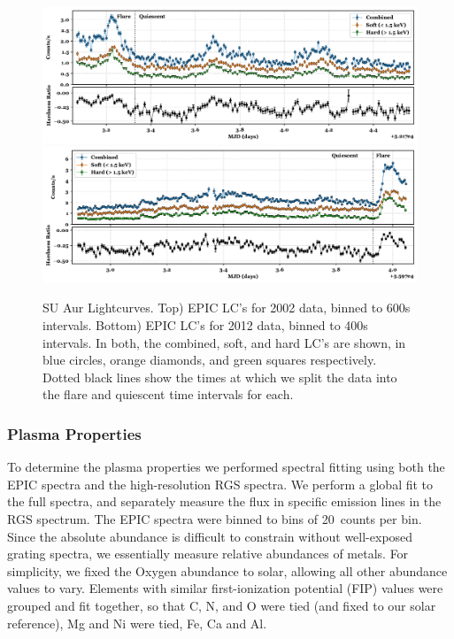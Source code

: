 \documentclass[twocolumn]{aastex631}
\begin{document}
\begin{figure}[b]
    \centering
    \includegraphics[width=0.9\linewidth]{Figures/SU Aur/figure_2002_lc.pdf}
    \includegraphics[width=0.9\linewidth]{Figures/SU Aur/figure_2012_lc.pdf}
    \caption{SU Aur Lightcurves. Top) EPIC LC's for 2002 data, binned to 600s intervals. Bottom) EPIC LC's for 2012 data, binned to 400s intervals. In both, the combined, soft, and hard LC's are shown, in blue circles, orange diamonds, and green squares respectively. Dotted black lines show the times at which we split the data into the flare and quiescent time intervals for each.}
    \label{fig:su_aur_lc}
\end{figure}

\subsubsection{Plasma Properties} \label{sec:plasma}

To determine the plasma properties we performed spectral fitting using both the EPIC spectra and the high-resolution RGS spectra. We perform a global fit to the full spectra, and separately measure the flux in specific emission lines in the RGS spectrum. The EPIC spectra were binned to bins of 20~counts per bin. Since the absolute abundance is difficult to constrain without well-exposed grating spectra, we essentially measure relative abundances of metals. For simplicity, we fixed the Oxygen abundance to solar, allowing all other abundance values to vary. Elements with similar first-ionization potential (FIP) values were grouped and fit together, so that C, N, and O were tied (and fixed to our solar reference), Mg and Ni were tied, Fe, Ca and Al.
\end{document}
